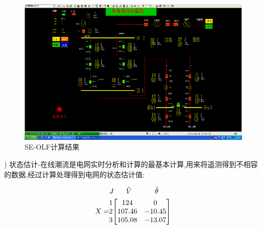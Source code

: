 \documentclass[a4paper]{ctexrep}
\begin{document}
                    \begin{figure}[htbp]
                        \centering
                        \includegraphics[width=12cm]{5.png}
                        \caption{SE-OLF计算结果}
                    \end{figure}
                    
                    ) 状态估计-在线潮流是电网实时分析和计算的最基本计算,用来将遥测得到不相容的数据,经过计算处理得到电网的状态估计值:

                    \begin{equation}
                        \begin{aligned}
                            & {\hspace{-0.2cm}\begin{tabular}{p{0.4cm} p{1cm} l}
                                $J$ & $\hat{V}$ & $\hat{\theta}$ \\
                            \end{tabular}} \\
                            X= & {\begin{matrix}
                                1  \\
                                2  \\
                                3  \\
                            \end{matrix}} {\left[\begin{matrix}
                                124 & 0 \\
                                107.46 & -10.45 \\
                                105.08 & -13.07 \\
                            \end{matrix} \right]}
                        \end{aligned}
                    \end{equation}
\end{document}
